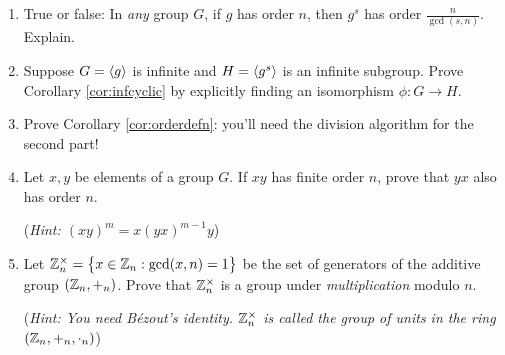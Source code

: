 \begin{exercises}
\begin{enumerate}
	  
	  \item True or false: In \emph{any} group $G$, if $g$ has order $n$, then $g^s$ has order $\frac n{\gcd(s,n)}$. Explain.
	  
	  
	  \item Suppose $G=\left\langle g\right\rangle$ is infinite and $H=\left\langle g^s\right\rangle$ is an infinite subgroup. Prove Corollary \ref{cor:infcyclic} by explicitly finding an isomorphism $\phi:G\to H$.
	
	
	  \item Prove Corollary \ref{cor:orderdefn}: you'll need the division algorithm for the second part!
	  
	  
		\item Let $x,y$ be elements of a group $G$. If $xy$ has finite order $n$, prove that $yx$ also has order $n$.\par
		(\emph{Hint: $(xy)^m=x(yx)^{m-1}y$})
		
		
		\item\label{exs:znmult} Let $\mathbb{Z}_n^\times=\bigl\{x\in\mathbb{Z}_n:\gcd(x,n)=1\bigr\}$ be the set of generators of the additive group $(\mathbb{Z}_n,+_n)$. Prove that $\mathbb{Z}_n^\times$ is a group under \emph{multiplication} modulo $n$.\par
		(\emph{Hint: You need Bézout's identity. $\mathbb{Z}_n^\times$ is called the group of units in the ring $(\mathbb{Z}_n,+_n,\cdot_n)$})
		
		

\end{enumerate}
\end{exercises}
